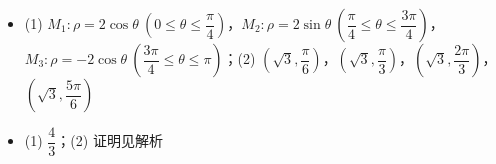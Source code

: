 \begin{itemize}[leftmargin=2.6em]
  \item[\textbf{22.}] (1) $M_1: \rho = 2\cos\theta\ (0 \leqslant \theta \leqslant \dfrac{\pi}{4})$，$M_2: \rho = 2\sin\theta\ (\dfrac{\pi}{4} \leqslant \theta \leqslant \dfrac{3\pi}{4})$，$M_3: \rho = -2\cos\theta\ (\dfrac{3\pi}{4} \leqslant \theta \leqslant \pi)$；(2) $\left(\sqrt{3}, \dfrac{\pi}{6}\right)$，$\left(\sqrt{3}, \dfrac{\pi}{3}\right)$，$\left(\sqrt{3}, \dfrac{2\pi}{3}\right)$，$\left(\sqrt{3}, \dfrac{5\pi}{6}\right)$
  \item[\textbf{23.}] (1) $\dfrac{4}{3}$；(2) 证明见解析
\end{itemize}
